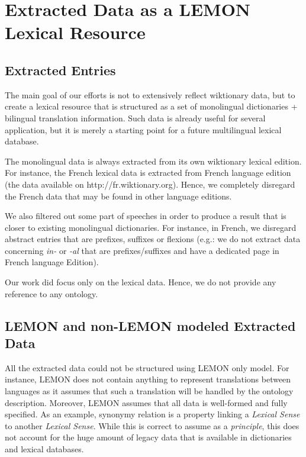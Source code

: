 \documentclass[10pt, a4paper]{article}
\begin{document}
\section{Extracted Data as a LEMON Lexical Resource}

\subsection{Extracted Entries}

The main goal of our efforts is not to extensively reflect wiktionary data, but to create a lexical resource that is structured as a set of monolingual dictionaries + bilingual translation information. Such data is already useful for several application, but it is merely a starting point for a future multilingual lexical database.

The monolingual data is always extracted from its own wiktionary lexical edition. For instance, the French lexical data is extracted from French language edition (the data available on http://fr.wiktionary.org). Hence, we completely disregard the French data that may be found in other language editions.

We also filtered out some part of speeches in order to produce a result that is closer to existing monolingual dictionaries. For instance, in French, we disregard abstract entries that are prefixes, suffixes or flexions (e.g.: we do not extract data concerning \textit{in-} or \textit{-al} that are prefixes/suffixes and have a dedicated page in French language Edition). 

Our work did focus only on the lexical data. Hence, we do not provide any reference to any ontology.  

\subsection{LEMON and non-LEMON modeled Extracted Data}

All the extracted data could not be structured using LEMON only model. For instance, LEMON does not contain anything to represent translations between languages as it assumes that such a translation will be handled by the ontology description. Moreover, LEMON assumes that all data is well-formed and fully specified. As an example, synonymy relation is a property linking a \textit{Lexical Sense} to another \textit{Lexical Sense}. While this is correct to assume as a \textit{principle}, this does not account for the huge amount of legacy data that is available in dictionaries and lexical databases.
\end{document}
